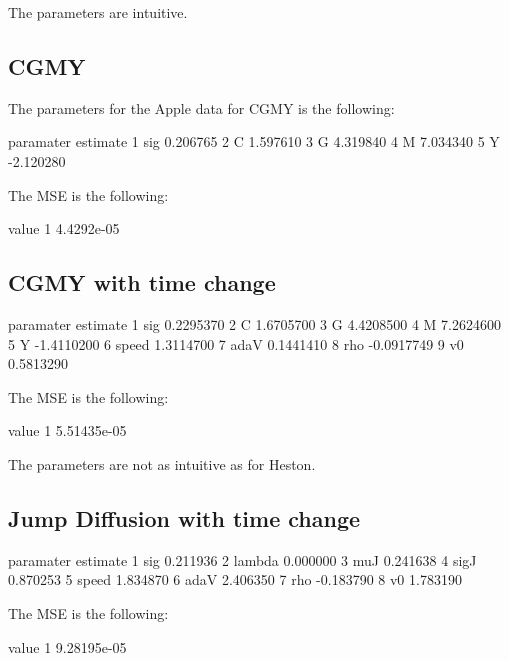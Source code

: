 \documentclass{article}
\begin{document}
The parameters are intuitive.

\subsection{CGMY}

The parameters for the Apple data for CGMY is the following:

\begin{Schunk}
\begin{Soutput}
  paramater  estimate
1       sig  0.206765
2         C  1.597610
3         G  4.319840
4         M  7.034340
5         Y -2.120280
\end{Soutput}
\end{Schunk}

The MSE is the following:

\begin{Schunk}
\begin{Soutput}
       value
1 4.4292e-05
\end{Soutput}
\end{Schunk}

\subsection{CGMY with time change}

\begin{Schunk}
\begin{Soutput}
  paramater   estimate
1       sig  0.2295370
2         C  1.6705700
3         G  4.4208500
4         M  7.2624600
5         Y -1.4110200
6     speed  1.3114700
7      adaV  0.1441410
8       rho -0.0917749
9        v0  0.5813290
\end{Soutput}
\end{Schunk}
The MSE is the following:

\begin{Schunk}
\begin{Soutput}
        value
1 5.51435e-05
\end{Soutput}
\end{Schunk}

The parameters are not as intuitive as for Heston.

\subsection{Jump Diffusion with time change}
\begin{Schunk}
\begin{Soutput}
  paramater  estimate
1       sig  0.211936
2    lambda  0.000000
3       muJ  0.241638
4      sigJ  0.870253
5     speed  1.834870
6      adaV  2.406350
7       rho -0.183790
8        v0  1.783190
\end{Soutput}
\end{Schunk}
The MSE is the following:

\begin{Schunk}
\begin{Soutput}
        value
1 9.28195e-05
\end{Soutput}
\end{Schunk}
\end{document}
